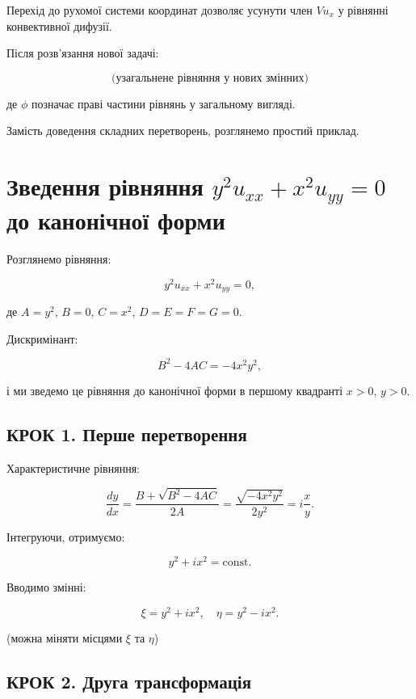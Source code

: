 Перехід до рухомої системи координат дозволяє усунути член \(V u_x\) у рівнянні конвективної дифузії.

Після розв'язання нової задачі:

\[
\text{(узагальнене рівняння у нових змінних)}
\]

де \(\phi\) позначає праві частини рівнянь у загальному вигляді.

Замість доведення складних перетворень, розглянемо простий приклад.

\section{\texorpdfstring{Зведення рівняння \(y^2 u_{xx} + x^2 u_{yy} = 0\) до канонічної форми}{Зведення рівняння y\^{}2 u\_\{xx\} + x\^{}2 u\_\{yy\} = 0 до канонічної форми}}\label{ux437ux432ux435ux434ux435ux43dux43dux44f-ux440ux456ux432ux43dux44fux43dux43dux44f-y2-u_xx-x2-u_yy-0-ux434ux43e-ux43aux430ux43dux43eux43dux456ux447ux43dux43eux457-ux444ux43eux440ux43cux438}

Розглянемо рівняння:

\[
y^2 u_{xx} + x^2 u_{yy} = 0,
\]

де \(A = y^2\), \(B = 0\), \(C = x^2\), \(D = E = F = G = 0\).

Дискримінант:

\[
B^2 - 4AC = -4x^2 y^2,
\]

і ми зведемо це рівняння до канонічної форми в першому квадранті \(x > 0\), \(y > 0\).

\subsection{КРОК 1. Перше перетворення}\label{ux43aux440ux43eux43a-1.-ux43fux435ux440ux448ux435-ux43fux435ux440ux435ux442ux432ux43eux440ux435ux43dux43dux44f}

Характеристичне рівняння:

\[
\frac{dy}{dx} = \frac{B + \sqrt{B^2 - 4AC}}{2A} = \frac{\sqrt{-4x^2 y^2}}{2y^2} = i \frac{x}{y}.
\]

Інтегруючи, отримуємо:

\[
y^2 + i x^2 = \text{const}.
\]

Вводимо змінні:

\[
\xi = y^2 + i x^2, \quad \eta = y^2 - i x^2.
\]

(можна міняти місцями \(\xi\) та \(\eta\))

\subsection{КРОК 2. Друга трансформація}\label{ux43aux440ux43eux43a-2.-ux434ux440ux443ux433ux430-ux442ux440ux430ux43dux441ux444ux43eux440ux43cux430ux446ux456ux44f}

